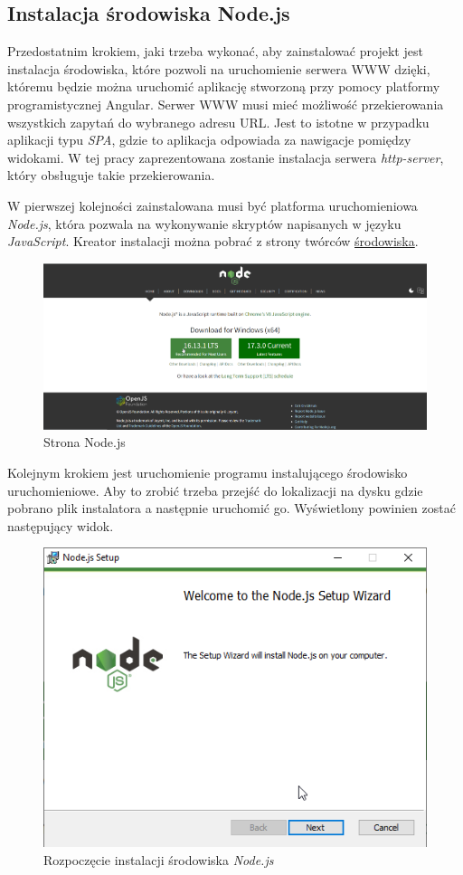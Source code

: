 \documentclass[a4paper,twoside,12pt]{book}
\begin{document}
{\subsection{Instalacja środowiska Node.js}
Przedostatnim krokiem, jaki trzeba wykonać, aby zainstalować projekt jest instalacja środowiska, które pozwoli na uruchomienie serwera WWW dzięki, któremu będzie można uruchomić aplikację stworzoną przy pomocy platformy programistycznej Angular. Serwer WWW musi mieć możliwość przekierowania wszystkich zapytań do wybranego adresu URL. Jest to istotne w przypadku aplikacji typu \textit{SPA}, gdzie to aplikacja odpowiada za nawigacje pomiędzy widokami. W tej pracy zaprezentowana zostanie instalacja serwera \textit{http-server}, który obsługuje takie przekierowania.

W pierwszej kolejności zainstalowana musi być platforma uruchomieniowa \textit{Node.js}, która pozwala na wykonywanie skryptów napisanych w języku \textit{JavaScript}. Kreator instalacji można pobrać z strony twórców \href{https://nodejs.org/en/}{środowiska}.
\begin{figure}[H]
	\centering
	\includegraphics[width=0.8\linewidth]{../zrzuty_ekranu/instalacja_nodejs/node_page}
	\caption{Strona Node.js}
	\label{fig:nodepage}
\end{figure}

Kolejnym krokiem jest uruchomienie programu instalującego środowisko uruchomieniowe. Aby to zrobić trzeba przejść do lokalizacji na dysku gdzie pobrano plik instalatora a następnie uruchomić go. Wyświetlony powinien zostać następujący widok.
\begin{figure}[h!]
	\centering
	\includegraphics[width=0.65\linewidth]{../zrzuty_ekranu/instalacja_nodejs/node1}
	\caption{Rozpoczęcie instalacji środowiska \textit{Node.js}}
	\label{fig:node1}
\end{figure}
\FloatBarrier

}
\end{document}
